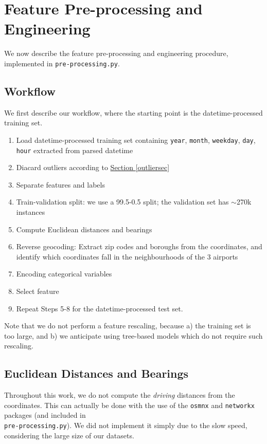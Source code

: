 \documentclass[12pt,letterpaper,final]{article}
\numberwithin{equation}{section}
\begin{document}
\section{Feature Pre-processing and Engineering}

We now describe the feature pre-processing and engineering procedure, implemented in \verb|pre-processing.py|.

\subsection{Workflow}

We first describe our workflow, where the starting point is the datetime-processed training set.

\begin{enumerate}
\item Load datetime-processed training set containing \verb|year|, \verb|month|, \verb|weekday|, \verb|day|, \verb|hour| extracted from parsed datetime
\item Diacard outliers according to \hyperref[outliersec]{Section \ref*{outliersec}}
\item Separate features and labels
\item Train-validation split: we use a 99.5-0.5 split; the validation set has $\sim$270k instances
\item Compute Euclidean distances and bearings
\item Reverse geocoding: Extract zip codes and boroughs from the coordinates, and identify which coordinates fall in the neighbourhoods of the 3 airports
\item Encoding categorical variables
\item Select feature
\item Repeat Steps 5-8 for the datetime-processed test set.
\end{enumerate}

Note that we do not perform a feature rescaling, because a) the training set is too large, and b) we anticipate using tree-based models which do not require such rescaling.

\subsection{Euclidean Distances and Bearings}

Throughout this work, we do not compute the \textit{driving} distances from the coordinates. This can actually be done with the use of the \verb|osmnx| and \verb|networkx| packages (and included in \\\verb|pre-processing.py|). We did not implement it simply due to the slow speed, considering the large size of our datasets. 
\end{document}
